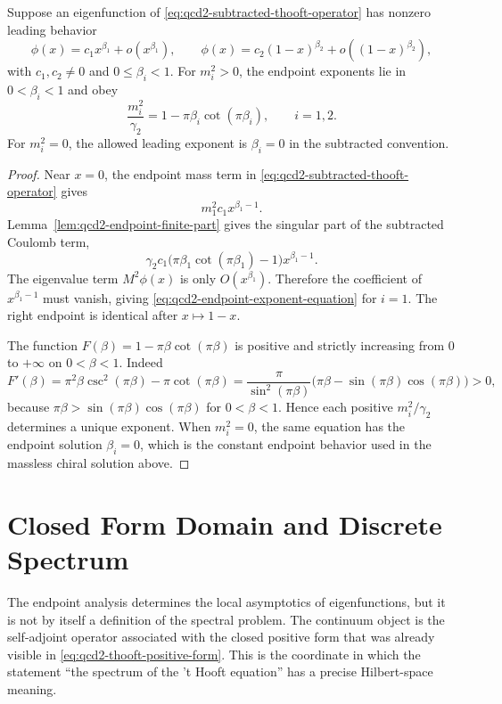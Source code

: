 \begin{lemma}
\label{lem:qcd2-endpoint-exponents}
Suppose an eigenfunction of
\eqref{eq:qcd2-subtracted-thooft-operator} has nonzero leading behavior
\[
  \phi(x)=c_1x^{\beta_1}+o(x^{\beta_1}),
  \qquad
  \phi(x)=c_2(1-x)^{\beta_2}+o((1-x)^{\beta_2}),
\]
with \(c_1,c_2\ne0\) and \(0\leq\beta_i<1\).  For \(m_i^2>0\), the endpoint
exponents lie in \(0<\beta_i<1\) and obey
\begin{equation}
  \frac{m_i^2}{\gamma_2}
  =
  1-\pi\beta_i\cot(\pi\beta_i),
  \qquad i=1,2.
  \label{eq:qcd2-endpoint-exponent-equation}
\end{equation}
For \(m_i^2=0\), the allowed leading exponent is \(\beta_i=0\) in the
subtracted convention.
\end{lemma}

\begin{proof}
Near \(x=0\), the endpoint mass term in
\eqref{eq:qcd2-subtracted-thooft-operator} gives
\[
  m_1^2c_1x^{\beta_1-1}.
\]
Lemma~\ref{lem:qcd2-endpoint-finite-part} gives the singular part of
the subtracted Coulomb term,
\[
  \gamma_2c_1
  \bigl(\pi\beta_1\cot(\pi\beta_1)-1\bigr)x^{\beta_1-1}.
\]
The eigenvalue term \(M^2\phi(x)\) is only \(O(x^{\beta_1})\).  Therefore the
coefficient of \(x^{\beta_1-1}\) must vanish, giving
\eqref{eq:qcd2-endpoint-exponent-equation} for \(i=1\).  The right endpoint
is identical after \(x\mapsto1-x\).

The function \(F(\beta)=1-\pi\beta\cot(\pi\beta)\) is positive and strictly
increasing from \(0\) to \(+\infty\) on \(0<\beta<1\).  Indeed
\[
  F'(\beta)
  =
  \pi^2\beta\csc^2(\pi\beta)-\pi\cot(\pi\beta)
  =
  \frac{\pi}{\sin^2(\pi\beta)}
  \bigl(\pi\beta-\sin(\pi\beta)\cos(\pi\beta)\bigr)>0,
\]
because \(\pi\beta>\sin(\pi\beta)\cos(\pi\beta)\) for \(0<\beta<1\).  Hence
each positive \(m_i^2/\gamma_2\) determines a unique exponent.  When
\(m_i^2=0\), the same equation has the endpoint solution \(\beta_i=0\), which
is the constant endpoint behavior used in the massless chiral solution above.
\end{proof}

\section{Closed Form Domain and Discrete Spectrum}
\label{sec:qcd2-closed-form-domain}

The endpoint analysis determines the local asymptotics of eigenfunctions, but
it is not by itself a definition of the spectral problem.  The continuum
object is the self-adjoint operator associated with the closed positive form
that was already visible in \eqref{eq:qcd2-thooft-positive-form}.  This is the
coordinate in which the statement ``the spectrum of the 't Hooft equation''
has a precise Hilbert-space meaning.


